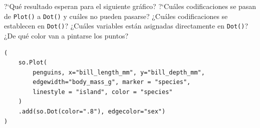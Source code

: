 \documentclass[a4paper,11pt]{article}
\theoremstyle{definition}
\begin{document}
\begin{enumerate}[resume]
?`Qu\'e resultado esperan para el siguiente gráfico? ?`Cu\'ales codificaciones se pasan de \lstinline{Plot()} a \lstinline{Dot()} y cuáles no pueden pasarse? ¿Cuáles codificaciones se establecen en \lstinline{Dot()}? ¿Cuáles variables están asignadas directamente en \lstinline{Dot()}? ¿De qué color van a pintarse los puntos?



\begin{lstlisting}
(
    so.Plot(
        penguins, x="bill_length_mm", y="bill_depth_mm",
        edgewidth="body_mass_g", marker = "species", 
        linestyle = "island", color = "species"
    )
    .add(so.Dot(color=".8"), edgecolor="sex")
)
\end{lstlisting}

\end{enumerate}
\end{document}
